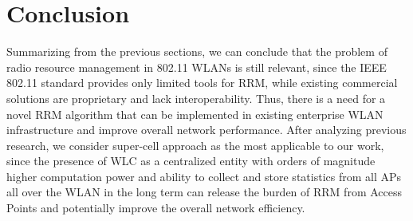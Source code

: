 \section {Conclusion}
\label{chap:lr:sec:conclusion}
Summarizing from the previous sections, we can conclude that the problem of radio resource management in 802.11 WLANs is still relevant, since the IEEE 802.11 standard provides only limited tools for RRM, while existing commercial solutions are proprietary and lack interoperability. Thus, there is a need for a novel RRM algorithm that can be implemented in existing enterprise WLAN infrastructure and improve overall network performance.
After analyzing previous research, we consider super-cell approach as the most applicable to our work, since the presence of WLC as a centralized entity with orders of magnitude higher computation power and ability to collect and store statistics from all APs all over the WLAN in the long term can release the burden of RRM from Access Points and potentially improve the overall network efficiency.